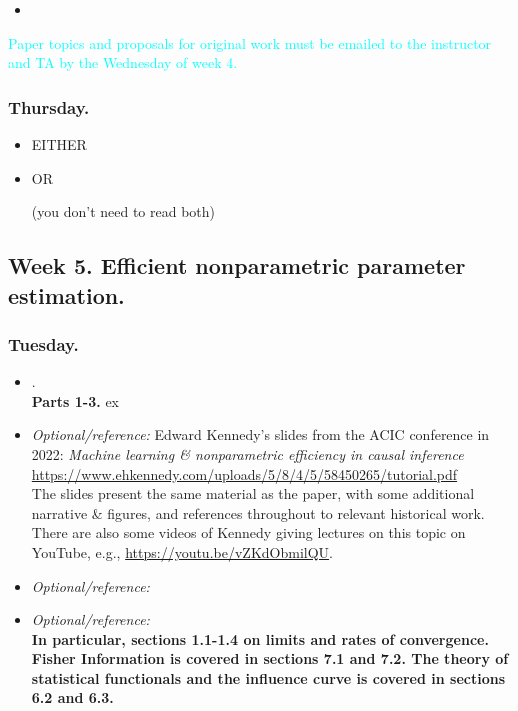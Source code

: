 \documentclass[letterpaper, 12pt, parskip=full,DIV=10]{scrartcl}
\begin{document}
\begin{itemize}
\item {}
\end{itemize}


\textcolor{cyan}{Paper topics and proposals for original work must be emailed to the instructor and TA by the Wednesday of week 4.}

\subsubsection*{Thursday.}

\begin{itemize}
\item EITHER\\ 
\item OR\\ 

(you don't need to read both)
\end{itemize}


\subsection*{Week 5. Efficient nonparametric parameter estimation.}
\subsubsection*{Tuesday.}

\begin{itemize}
\item {}. \\
\textbf{Parts 1-3.} ex
\item  \textit{Optional/reference:} Edward Kennedy's slides from the ACIC conference in 2022: \emph{Machine learning \& nonparametric efficiency
in causal inference} \url{https://www.ehkennedy.com/uploads/5/8/4/5/58450265/tutorial.pdf}\\
The slides present the same material as the paper, with some additional narrative \& figures, and references throughout to relevant historical work. There are also some videos of Kennedy giving lectures on this topic on YouTube, e.g., \url{https://youtu.be/vZKdObmilQU}. 
\item  \textit{Optional/reference:} 
\item  \textit{Optional/reference:} \\
\textbf{In particular, sections 1.1-1.4 on limits and rates of convergence. Fisher Information is covered in sections 7.1 and 7.2. The theory of statistical functionals and the influence curve is covered in sections 6.2 and 6.3.}
\end{itemize}
\end{document}
